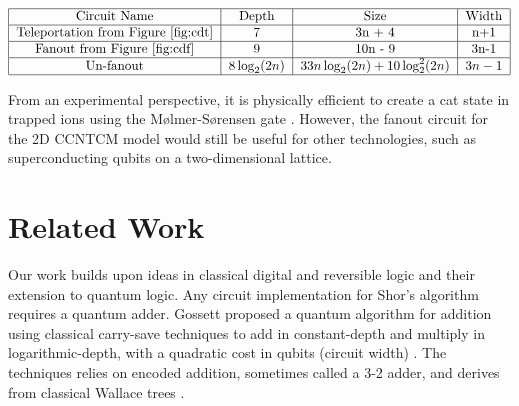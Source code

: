 \documentclass[twoside]{article}
\begin{document}
\begin{table}
\begin{displaymath}
\begin{tabular}{|c|c|c|c|}
\hline
\text{Circuit Name} & \text{Depth} & \text{Size} & \text{Width}\\
\hline
\text{Teleportation from Figure \ref{fig:cdt}} & 7 & 3n + 4 & n+1\\
\hline
\text{Fanout from Figure \ref{fig:cdf}} & 9 & 10n - 9 & 3n-1 \\
\hline
\text{Un-fanout} & $8\log_2(2n)$ & $33n\log_2(2n) + 10\log^2_2(2n)$ & $3n-1$ \\
\hline
\end{tabular}
\end{displaymath}
\centerline{}
\label{tab:cd-resources}
\end{table}

From an experimental perspective, it is physically efficient to create
a cat state in trapped ions using the M{\o}lmer-S{\o}rensen gate
\cite{Sorensen2000}\cite{Benhelm2008}. However, the fanout circuit for
the 2D CCNTCM model would still be useful for other technologies, such
as superconducting qubits on a two-dimensional lattice.


%
\section{Related Work}
\label{sec:related}

Our work builds upon ideas in classical digital and reversible logic and their extension to quantum logic.
Any circuit implementation for Shor's algorithm requires a quantum adder.
Gossett proposed a quantum algorithm for addition using classical carry-save techniques to add
in constant-depth and multiply in logarithmic-depth, with a quadratic
cost in qubits (circuit width) \cite{Gossett1998}. The techniques relies on encoded addition, sometimes
called a 3-2 adder, and derives from classical Wallace trees \cite{Wallace1964}.
\end{document}
